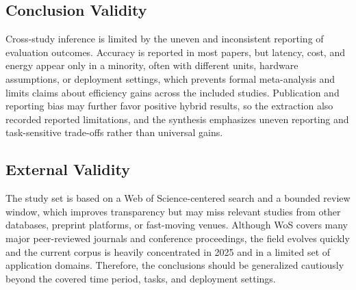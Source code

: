 \subsection{Conclusion Validity}

Cross-study inference is limited by the uneven and inconsistent reporting of evaluation outcomes. Accuracy is reported in most papers, but latency, cost, and energy appear only in a minority, often with different units, hardware assumptions, or deployment settings, which prevents formal meta-analysis and limits claims about efficiency gains across the included studies. Publication and reporting bias may further favor positive hybrid results, so the extraction also recorded reported limitations, and the synthesis emphasizes uneven reporting and task-sensitive trade-offs rather than universal gains.

\subsection{External Validity}

The study set is based on a Web of Science-centered search and a bounded review window, which improves transparency but may miss relevant studies from other databases, preprint platforms, or fast-moving venues. Although WoS covers many major peer-reviewed journals and conference proceedings, the field evolves quickly and the current corpus is heavily concentrated in 2025 and in a limited set of application domains. Therefore, the conclusions should be generalized cautiously beyond the covered time period, tasks, and deployment settings.
